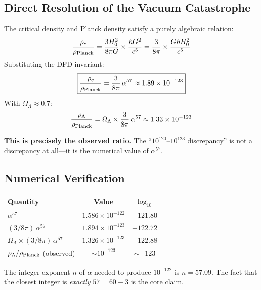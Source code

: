 \documentclass[11pt]{article}
\begin{document}
\subsection{Direct Resolution of the Vacuum Catastrophe}

The critical density and Planck density satisfy a purely algebraic relation:
\begin{equation}
\frac{\rho_c}{\rho_{\rm Planck}} = \frac{3H_0^2}{8\pi G} \times \frac{\hbar G^2}{c^5}
= \frac{3}{8\pi} \times \frac{G\hbar H_0^2}{c^5}
\end{equation}
Substituting the DFD invariant:
\begin{equation}
\boxed{\frac{\rho_c}{\rho_{\rm Planck}} = \frac{3}{8\pi}\,\alpha^{57} \approx 1.89 \times 10^{-123}}
\end{equation}
With $\Omega_\Lambda \approx 0.7$:
\begin{equation}
\frac{\rho_\Lambda}{\rho_{\rm Planck}} = \Omega_\Lambda \times \frac{3}{8\pi}\,\alpha^{57} \approx 1.33 \times 10^{-123}
\end{equation}

\textbf{This is precisely the observed ratio.} The ``$10^{120}$--$10^{123}$ discrepancy''
is not a discrepancy at all---it is the numerical value of $\alpha^{57}$.

\subsection{Numerical Verification}

\begin{center}
\begin{tabular}{lcc}
\toprule
\textbf{Quantity} & \textbf{Value} & \textbf{$\log_{10}$} \\
\midrule
$\alpha^{57}$ & $1.586 \times 10^{-122}$ & $-121.80$ \\
$(3/8\pi)\,\alpha^{57}$ & $1.894 \times 10^{-123}$ & $-122.72$ \\
$\Omega_\Lambda \times (3/8\pi)\,\alpha^{57}$ & $1.326 \times 10^{-123}$ & $-122.88$ \\
$\rho_\Lambda/\rho_{\rm Planck}$ (observed) & $\sim 10^{-123}$ & $\sim -123$ \\
\bottomrule
\end{tabular}
\end{center}

The integer exponent $n$ of $\alpha$ needed to produce $10^{-122}$ is $n = 57.09$.
The fact that the closest integer is \emph{exactly} $57 = 60 - 3$ is the core claim.
\end{document}
